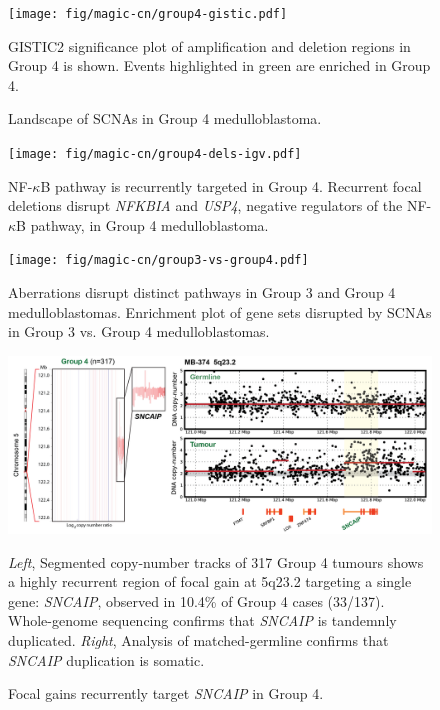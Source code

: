 \documentclass[11pt,letterpaper]{article}
\theoremstyle{definition}
\begin{document}
\clearpage

\begin{figure}[h]
	\begin{center}
		\texttt{[image: fig/magic-cn/group4-gistic.pdf]}
	\end{center}
	\caption{Landscape of SCNAs in Group 4 medulloblastoma.}
	GISTIC2 significance plot of amplification and deletion regions in Group 4 is shown. Events highlighted in green are enriched in Group 4.
	\label{fig:group4-gistic}
\end{figure}

\clearpage

\begin{figure}
	\centering
	\texttt{[image: fig/magic-cn/group4-dels-igv.pdf]}
	\caption{NF-$\kappa$B pathway is recurrently targeted in Group 4.
		Recurrent focal deletions disrupt \emph{NFKBIA} and \emph{USP4}, negative regulators of the NF-$\kappa$B pathway, in Group 4 medulloblastoma.}
	\label{fig:group4-del-igv}
\end{figure}

\begin{figure}
	\centering
	\texttt{[image: fig/magic-cn/group3-vs-group4.pdf]}
	\caption{Aberrations disrupt distinct pathways in Group 3 and Group 4 medulloblastomas.
	Enrichment plot of gene sets disrupted by SCNAs in Group 3 vs. Group 4 medulloblastomas.}
	\label{fig:group3-vs-group4}
\end{figure}

\clearpage

\begin{figure}[h]
	\begin{center}
		\includegraphics[width=\textwidth]{fig/magic-cn/sncaip-gain.png}
	\end{center}
	\caption{Focal gains recurrently target \emph{SNCAIP} in Group 4.}
	\emph{Left}, Segmented copy-number tracks of 317 Group 4 tumours shows a highly recurrent region of focal gain at 5q23.2 targeting a single gene: \emph{SNCAIP}, observed in 10.4\% of Group 4 cases (33/137). Whole-genome sequencing confirms that \emph{SNCAIP} is tandemnly duplicated. \emph{Right}, Analysis of matched-germline confirms that \emph{SNCAIP} duplication is somatic.
	\label{fig:sncaip-gain}
\end{figure}
\end{document}
